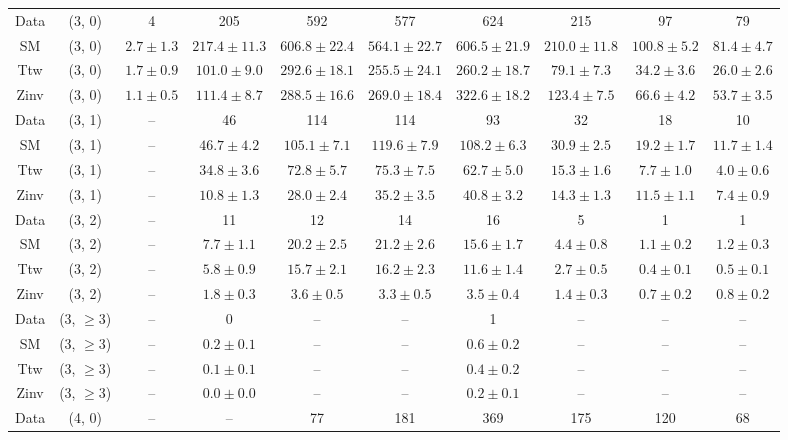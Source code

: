 \begin{table}[h!]
{\begin{tabular}{cccccccccc}
	Data & (3, 0) & 4 & 205 & 592 & 577 & 624 & 215 & 97 & 79 \\[0.5ex] 
	SM & (3, 0) & $2.7\pm 1.3$ & $217.4\pm 11.3$ & $606.8\pm 22.4$ & $564.1\pm 22.7$ & $606.5\pm 21.9$ & $210.0\pm 11.8$ & $100.8\pm 5.2$ & $81.4\pm 4.7$ \\[0.5ex] 
	Ttw & (3, 0) & $1.7\pm 0.9$ & $101.0\pm 9.0$ & $292.6\pm 18.1$ & $255.5\pm 24.1$ & $260.2\pm 18.7$ & $79.1\pm 7.3$ & $34.2\pm 3.6$ & $26.0\pm 2.6$ \\[0.5ex] 
	Zinv & (3, 0) & $1.1\pm 0.5$ & $111.4\pm 8.7$ & $288.5\pm 16.6$ & $269.0\pm 18.4$ & $322.6\pm 18.2$ & $123.4\pm 7.5$ & $66.6\pm 4.2$ & $53.7\pm 3.5$ \\[0.5ex] 
	Data & (3, 1) & -- & 46 & 114 & 114 & 93 & 32 & 18 & 10 \\[0.5ex] 
	SM & (3, 1) & -- & $46.7\pm 4.2$ & $105.1\pm 7.1$ & $119.6\pm 7.9$ & $108.2\pm 6.3$ & $30.9\pm 2.5$ & $19.2\pm 1.7$ & $11.7\pm 1.4$ \\[0.5ex] 
	Ttw & (3, 1) & -- & $34.8\pm 3.6$ & $72.8\pm 5.7$ & $75.3\pm 7.5$ & $62.7\pm 5.0$ & $15.3\pm 1.6$ & $7.7\pm 1.0$ & $4.0\pm 0.6$ \\[0.5ex] 
	Zinv & (3, 1) & -- & $10.8\pm 1.3$ & $28.0\pm 2.4$ & $35.2\pm 3.5$ & $40.8\pm 3.2$ & $14.3\pm 1.3$ & $11.5\pm 1.1$ & $7.4\pm 0.9$ \\[0.5ex] 
	Data & (3, 2) & -- & 11 & 12 & 14 & 16 & 5 & 1 & 1 \\[0.5ex] 
	SM & (3, 2) & -- & $7.7\pm 1.1$ & $20.2\pm 2.5$ & $21.2\pm 2.6$ & $15.6\pm 1.7$ & $4.4\pm 0.8$ & $1.1\pm 0.2$ & $1.2\pm 0.3$ \\[0.5ex] 
	Ttw & (3, 2) & -- & $5.8\pm 0.9$ & $15.7\pm 2.1$ & $16.2\pm 2.3$ & $11.6\pm 1.4$ & $2.7\pm 0.5$ & $0.4\pm 0.1$ & $0.5\pm 0.1$ \\[0.5ex] 
	Zinv & (3, 2) & -- & $1.8\pm 0.3$ & $3.6\pm 0.5$ & $3.3\pm 0.5$ & $3.5\pm 0.4$ & $1.4\pm 0.3$ & $0.7\pm 0.2$ & $0.8\pm 0.2$ \\[0.5ex] 
	Data & (3, $\ge3$) & -- & 0 & -- & -- & 1 & -- & -- & -- \\[0.5ex] 
	SM & (3, $\ge3$) & -- & $0.2\pm 0.1$ & -- & -- & $0.6\pm 0.2$ & -- & -- & -- \\[0.5ex] 
	Ttw & (3, $\ge3$) & -- & $0.1\pm 0.1$ & -- & -- & $0.4\pm 0.2$ & -- & -- & -- \\[0.5ex] 
	Zinv & (3, $\ge3$) & -- & $0.0\pm 0.0$ & -- & -- & $0.2\pm 0.1$ & -- & -- & -- \\[0.5ex] 
	Data & (4, 0) & -- & -- & 77 & 181 & 369 & 175 & 120 & 68 \\[0.5ex] 

\end{tabular}}
\end{table}
